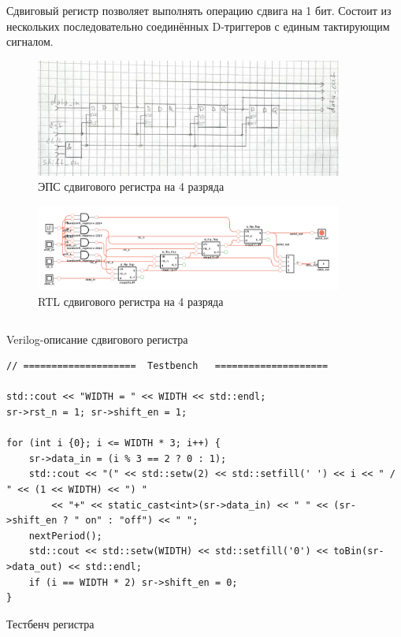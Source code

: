 \documentclass[a4paper]{article}
\begin{document}
  Сдвиговый регистр позволяет выполнять операцию сдвига на 1 бит. Состоит из нескольких
  последовательно соединённых D-триггеров с единым тактирующим сигналом.

  \begin{figure}[H]
    \centering
    \includegraphics[width=0.9\textwidth]{lab_320.jpg}
    \caption{ЭПС сдвигового регистра на 4 разряда}
  \end{figure}

  \begin{figure}[H]
    \centering
    \includegraphics[width=0.9\textwidth]{lab_321}
    \caption{RTL сдвигового регистра на 4 разряда}
  \end{figure}

  \begin{listing}[H]
    \inputminted{verilog}{../chapter_6/shift_reg/shift_register.v}
    \caption{Verilog-описание сдвигового регистра}
  \end{listing}

  \begin{listing}[H]
    \begin{verbatim}
// ====================  Testbench   ====================

std::cout << "WIDTH = " << WIDTH << std::endl;
sr->rst_n = 1; sr->shift_en = 1;

for (int i {0}; i <= WIDTH * 3; i++) {
    sr->data_in = (i % 3 == 2 ? 0 : 1);
    std::cout << "(" << std::setw(2) << std::setfill(' ') << i << " / " << (1 << WIDTH) << ") "
        << "+" << static_cast<int>(sr->data_in) << " " << (sr->shift_en ? " on" : "off") << " ";
    nextPeriod();
    std::cout << std::setw(WIDTH) << std::setfill('0') << toBin(sr->data_out) << std::endl;
    if (i == WIDTH * 2) sr->shift_en = 0;
}
    \end{verbatim}
    \caption{Тестбенч регистра}
  \end{listing}
\end{document}
